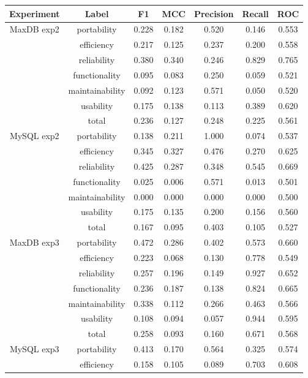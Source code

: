 \documentclass{acm_proc_article-sp}
\begin{document}
\begin{table}[h]
	\centering

\begin{tabular}{c|c|c|c|c|c|c}
\toprule
Experiment & Label & F1 & MCC & Precision & Recall & ROC  \\ 
\midrule
MaxDB exp2 & portability & 0.228 & 0.182 & 0.520 & 0.146 & 0.553 \\ 
 & efficiency & 0.217 & 0.125 & 0.237 & 0.200 & 0.558\\ 
 & reliability & 0.380 & 0.340 & 0.246 & 0.829 & 0.765 \\ 
 & functionality & 0.095 & 0.083 & 0.250 & 0.059 & 0.521 \\ 
 & maintainability & 0.092 & 0.123 & 0.571 & 0.050 & 0.520 \\ 
 & usability & 0.175 & 0.138 & 0.113 & 0.389 & 0.620 \\ 
 & total & 0.236 & 0.127 & 0.248 & 0.225 & 0.561 \\ 
\midrule
MySQL exp2 & portability & 0.138 & 0.211 & 1.000 & 0.074 & 0.537 \\ 
 & efficiency & 0.345 & 0.327 & 0.476 & 0.270 & 0.625 \\ 
 & reliability & 0.425 & 0.287 & 0.348 & 0.545 & 0.669 \\ 
 & functionality & 0.025 & 0.006 & 0.571 & 0.013 & 0.501 \\ 
 & maintainability & 0.000 & 0.000 & 0.000 & 0.000 & 0.500 \\ 
 & usability & 0.175 & 0.135 & 0.200 & 0.156 & 0.560 \\ 
 & total & 0.167 & 0.095 & 0.403 & 0.105 & 0.527 \\ 
\midrule
MaxDB exp3 & portability & 0.472 & 0.286 & 0.402 & 0.573 & 0.660 \\ 
 & efficiency & 0.223 & 0.068 & 0.130 & 0.778 & 0.549 \\ 
 & reliability & 0.257 & 0.196 & 0.149 & 0.927 & 0.652 \\ 
 & functionality & 0.236 & 0.187 & 0.138 & 0.824 & 0.665 \\ 
 & maintainability & 0.338 & 0.112 & 0.266 & 0.463 & 0.566 \\ 
 & usability & 0.108 & 0.094 & 0.057 & 0.944 & 0.595 \\ 
 & total & 0.258 & 0.093 & 0.160 & 0.671 & 0.568 \\ 
\midrule
MySQL exp3 & portability & 0.413 & 0.170 & 0.564 & 0.325 & 0.574 \\ 
 & efficiency & 0.158 & 0.105 & 0.089 & 0.703 & 0.608 \\ 

\end{tabular}
\end{table}
\end{document}

